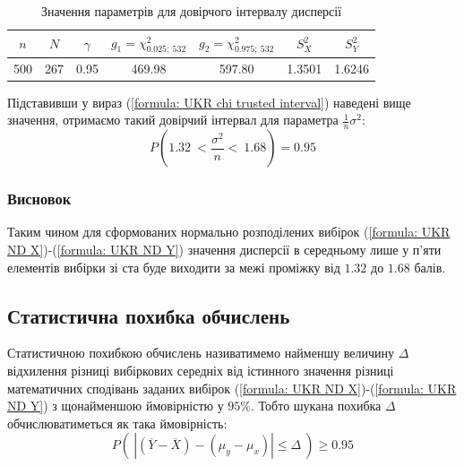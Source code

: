 \vspace{0.8cm}
\begin{table}[H]
    \begin{center}
        \begin{tabular}{||c|c|c|c|c|c|c||}
            \hline
            $n$ & $N$ & $\gamma$ & $g_1=\chi^2_{0.025;\ 532}$ & $g_2=\chi^2_{0.975;\ 532}$ & $S_X^2$ & $S_Y^2$ \\
            \hline \hline
            500 & 267 & 0.95 & 469.98 & 597.80 & 1.3501 & 1.6246 \\
            \hline
        \end{tabular}
        \caption{Значення параметрів для довірчого інтервалу дисперсії}
        \label{table: UKR chi interval}
    \end{center}
\end{table}

Підставивши у вираз (\ref{formula: UKR chi trusted interval}) наведені вище значення, отримаємо 
такий довірчий інтервал для параметра $\frac{1}{n}\sigma^2:$
\begin{equation*}
    P(1.32\ < \frac{\sigma^2}{n} <\ 1.68)=0.95
\end{equation*}

\subsubsection{Висновок}

Таким чином для сформованих нормально розподілених вибірок (\ref{formula: UKR ND X})-(\ref{formula: UKR ND Y}) 
значення дисперсії в середньому лише у п'яти елементів вибірки зі ста буде виходити за межі проміжку від $1.32$ 
до $1.68$ балів.

\subsection{Статистична похибка обчислень}
\label{page: UKR percentage point}

Статистичною похибкою обчислень називатимемо найменшу величину $\Delta$ відхилення різниці вибіркових 
середніх від істинного значення різниці математичних сподівань заданих вибірок (\ref{formula: UKR ND X})-(\ref{formula: UKR ND Y}) 
з щонайменшою ймовірністю у $95\%$. Тобто шукана похибка $\Delta$ обчислюватиметься як така ймовірність:
\begin{equation*}
    P\left(\ \left| (\overline{Y}-\overline{X})-(\mu_y-\mu_x) \right| \leqslant \Delta\ \right)\geqslant 0.95
\end{equation*}

